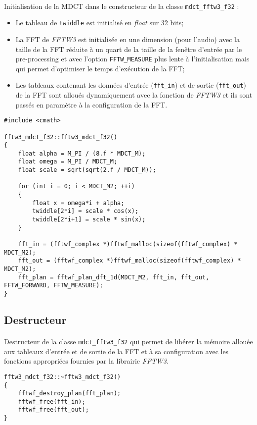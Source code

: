 \documentclass{article}
\begin{document}
\paragraph{}
Initialisation de la MDCT dans le constructeur de la classe \texttt{mdct\_fftw3\_f32} :
\begin{itemize}
    \item Le tableau de \texttt{twiddle} est initialisé en \emph{float} sur 32 bits;
    \item La FFT de \emph{FFTW3} est initialisée en une dimension (pour l'audio) avec la taille de la FFT réduite à un quart de la taille de la fenêtre d'entrée par le pre-processing et avec l'option \texttt{FFTW\_MEASURE} plus lente à l'initialisation mais qui permet d'optimiser le temps d'exécution de la FFT;
    \item Les tableaux contenant les données d'entrée (\texttt{fft\_in}) et de sortie (\texttt{fft\_out}) de la FFT sont alloués dynamiquement avec la fonction de \emph{FFTW3} et ils sont passés en paramètre à la configuration de la FFT.
\end{itemize}
\lstset{language=C++}
\begin{lstlisting}
#include <cmath>

fftw3_mdct_f32::fftw3_mdct_f32()
{
    float alpha = M_PI / (8.f * MDCT_M);
    float omega = M_PI / MDCT_M;
    float scale = sqrt(sqrt(2.f / MDCT_M));

    for (int i = 0; i < MDCT_M2; ++i)
    {
        float x = omega*i + alpha;
        twiddle[2*i] = scale * cos(x);
        twiddle[2*i+1] = scale * sin(x);
    }

    fft_in = (fftwf_complex *)fftwf_malloc(sizeof(fftwf_complex) * MDCT_M2);
    fft_out = (fftwf_complex *)fftwf_malloc(sizeof(fftwf_complex) * MDCT_M2);
    fft_plan = fftwf_plan_dft_1d(MDCT_M2, fft_in, fft_out, FFTW_FORWARD, FFTW_MEASURE);
}
\end{lstlisting}

\subsection{Destructeur}\label{app:mdct_fftw3_f32_destructor}
\paragraph{}
Destructeur de la classe \texttt{mdct\_fftw3\_f32} qui permet de libérer la mémoire allouée aux tableaux d'entrée et de sortie de la FFT et à sa configuration avec les fonctions appropriées fournies par la librairie \emph{FFTW3}.
\lstset{language=C++}
\begin{lstlisting}
fftw3_mdct_f32::~fftw3_mdct_f32()
{
    fftwf_destroy_plan(fft_plan);
    fftwf_free(fft_in);
    fftwf_free(fft_out);
}
\end{lstlisting}
\end{document}
